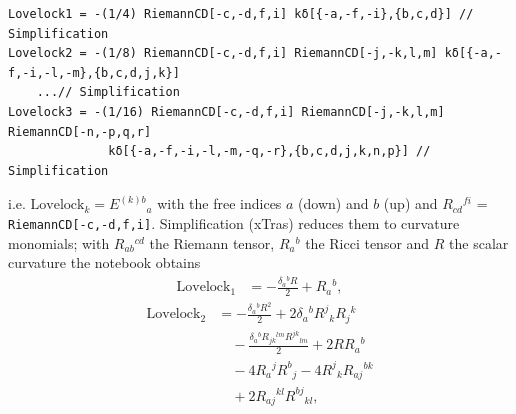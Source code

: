\documentclass[10pt,a4paper]{article}
\begin{document}
\begin{Verbatim}[fontsize=\small,frame=single,framesep=2mm]
Lovelock1 = -(1/4) RiemannCD[-c,-d,f,i] kδ[{-a,-f,-i},{b,c,d}] // Simplification
Lovelock2 = -(1/8) RiemannCD[-c,-d,f,i] RiemannCD[-j,-k,l,m] kδ[{-a,-f,-i,-l,-m},{b,c,d,j,k}]
    ...// Simplification
Lovelock3 = -(1/16) RiemannCD[-c,-d,f,i] RiemannCD[-j,-k,l,m] RiemannCD[-n,-p,q,r]
              kδ[{-a,-f,-i,-l,-m,-q,-r},{b,c,d,j,k,n,p}] // Simplification
\end{Verbatim}
i.e. $\mathrm{Lovelock}_k=E^{(k)b}{}_a$ with the free indices $a$ (down) and $b$ (up) and $R_{cd}{}^{fi}$ = \texttt{RiemannCD[-c,-d,f,i]}. Simplification (xTras) reduces them to curvature monomials; with $R_{ab}{}^{cd}$ the Riemann tensor, $R_a{}^b$ the Ricci tensor and $R$ the scalar curvature the notebook obtains
\begin{align*}
\mathrm{Lovelock}_{1}&=- \frac{\delta_{a}{}^{b} R}{2} + R_{a}{}^{b},
\end{align*}
\begin{align*}
\mathrm{Lovelock}_{2}&=- \frac{\delta_{a}{}^{b} R^{2}}{2} + 2 \delta_{a}{}^{b} R^{j}{}_{k} R_{j}{}^{k} \\
&\quad - \frac{\delta_{a}{}^{b} R_{jk}{}^{lm} R^{jk}{}_{lm}}{2} + 2 R R_{a}{}^{b} \\
&\quad - 4 R_{a}{}^{j} R^{b}{}_{j} - 4 R^{j}{}_{k} R_{aj}{}^{bk} \\
&\quad + 2 R_{aj}{}^{kl} R^{bj}{}_{kl},
\end{align*}
\end{document}
